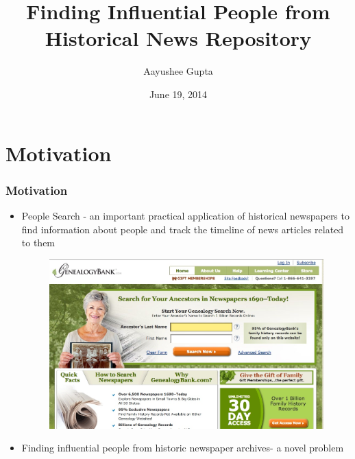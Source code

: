 \documentclass{beamer}
\title{Finding Influential People from Historical News Repository}
\author{Aayushee Gupta}
\institute{Indraprastha Institute of Information Technology}
\date{June 19, 2014}
\begin{document}
\maketitle


\section{Motivation}
\begin{frame}
\frametitle{Motivation}
 
\begin{itemize}
\item People Search - an important practical application of historical newspapers to find information about people and track the timeline of news articles related to them
\begin{figure}[ht]
\begin{center}
\includegraphics[scale=0.2]{genealogy.jpg}
\end{center}
\end{figure}
\item Finding influential people from historic newspaper archives- a novel problem
\end{itemize}
\end{frame}


\end{document}
